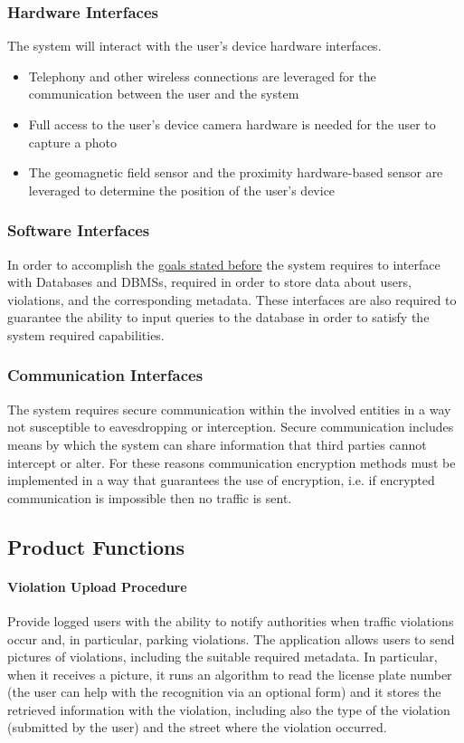 \subsubsection{Hardware Interfaces}
\label{sec:hardwareinterfaces}
	The system will interact with the user's device hardware interfaces.	
	\begin{itemize} 
		\item Telephony and other wireless connections are leveraged for the communication between the user and the system
		\item Full access to the user's device camera hardware is needed for the user to capture a photo
		\item The geomagnetic field sensor and the proximity hardware-based sensor are leveraged to determine the position of the user's device
	\end{itemize}

\subsubsection{Software Interfaces}
	In order to accomplish the \hyperref[sec:goals]{goals stated before} the system requires to interface with Databases and DBMSs, required in order to store data about users, violations, and the corresponding metadata. These interfaces are also required to guarantee the ability to input queries to the database in order to satisfy the system required capabilities.
	
\subsubsection{Communication Interfaces}
	The system requires secure communication within the involved entities in a way not susceptible to eavesdropping or interception. Secure communication includes means by which the system can share information that third parties cannot intercept or alter. For these reasons communication encryption methods must be implemented in a way that guarantees the use of encryption, i.e. if encrypted communication is impossible then no traffic is sent.

\subsection{Product Functions}
\paragraph{Violation Upload Procedure} 
Provide logged users with the ability to notify authorities when traffic violations occur and, in particular, parking violations. The application allows users to send pictures of violations, including the suitable required metadata. In particular, when it receives a picture, it runs an algorithm to read the license plate number (the user can help with the recognition via an optional form) and it stores the retrieved information with the violation, including also the type of the violation (submitted by the user) and the street where the violation occurred. \cite{Assignments}

